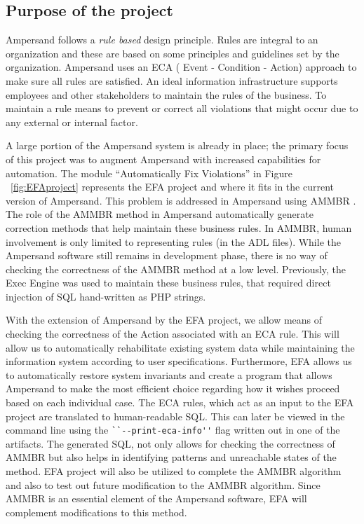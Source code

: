 %

\subsection{Purpose of the project}

Ampersand follows a \emph{rule based} design principle. Rules are integral to an organization
and these are based on some principles and guidelines set by the organization.
Ampersand uses an ECA ( Event - Condition - Action) approach to make sure all rules are satisfied. An ideal information infrastructure supports employees and other stakeholders to maintain the rules of the business. To maintain a rule means to prevent or correct all violations that might occur due to any external or internal factor.
 
 A large portion of the Ampersand system is already in place; the primary focus of this project was to
augment Ampersand with increased capabilities for automation. The module ``Automatically Fix Violations'' in Figure ~\ref{fig:EFAproject} represents the EFA project and where it fits in the current version of Ampersand.
This problem is addressed in Ampersand using AMMBR \citep{Ampersand}. The role of the AMMBR method in Ampersand automatically generate correction methods that help maintain these business rules. In AMMBR, human involvement is only limited to representing rules (in the ADL files). While the Ampersand software still remains in development phase, there is no way of checking the correctness of the AMMBR method at a low level. Previously, the Exec Engine was used to maintain these business rules, that required direct injection of SQL hand-written as PHP strings. 
 
With the extension of Ampersand by the EFA project, we allow means of checking the correctness of the Action associated with an ECA rule. This will allow us to automatically rehabilitate existing system data while 
maintaining the information system according to user specifications. 
Furthermore, EFA allows us to
automatically restore system invariants and create a program that allows 
Ampersand to make the most efficient choice regarding how it 
wishes proceed 
based on each individual case. The ECA rules, which act as an input to the EFA project are translated to human-readable SQL. This can later be viewed in the command line using the \verb|``--print-eca-info''| flag written out in one of the artifacts. The generated SQL, not only allows for checking the correctness of AMMBR but also helps in identifying 
patterns and unreachable states of the method. EFA project will also be utilized to complete the AMMBR algorithm and also to test out future modification to the AMMBR algorithm.  Since AMMBR is an essential element of the Ampersand software, EFA will complement modifications to this method.


